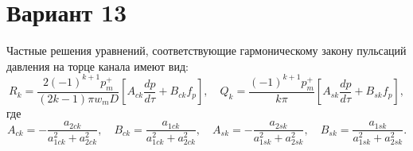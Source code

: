 \documentclass{article}
\begin{document}
\section*{Вариант 13}
Частные решения уравнений, соответствующие гармоническому закону пульсаций давления на торце канала имеют вид:
\begin{equation*}
 R_k = \frac{2(-1)^{k+1} p_m^+}{(2k-1)\pi w_m D} \left[ A_{ck} \frac{dp}{d\tau} + B_{ck} f_p \right], \quad Q_k = \frac{(-1)^{k+1} p_m^+}{k\pi} \left[ A_{sk} \frac{dp}{d\tau} + B_{sk} f_p \right],
\end{equation*}
где
\begin{equation*}
	A_{ck} = -\frac{a_{2ck}}{a_{1ck}^2 + a_{2ck}^2}, \quad B_{ck} = \frac{a_{1ck}}{a_{1ck}^2 + a_{2ck}^2}, \quad A_{sk} = -\frac{a_{2sk}}{a_{1sk}^2 + a_{2sk}^2}, \quad B_{sk} = \frac{a_{1sk}}{a_{1sk}^2 + a_{2sk}^2}.
\end{equation*}
\end{document}
